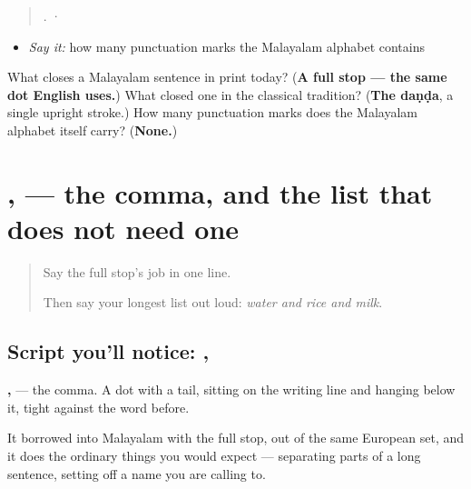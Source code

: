 \begin{quote}
.  ·  
\end{quote}

\begin{itemize}
\raggedright
  \item \emph{Say it:} how many punctuation marks the Malayalam alphabet contains
\end{itemize}

\begin{tcolorbox}[breakable,colback=teal!4,colframe=teal!35!black,title={Before you move on}]
What closes a Malayalam sentence in print today? (\textbf{A full stop — the same dot English uses.}) What closed one in the classical tradition? (\textbf{The daṇḍa}, a single upright stroke.) How many punctuation marks does the Malayalam alphabet itself carry? (\textbf{None.})
\end{tcolorbox}
\section[, (comma)]{, — the comma, and the list that does not need one}

\label{lesson:ML-W108-comma}



\begin{quote}
Say the full stop's job in one line.

Then say your longest list out loud: \emph{water and rice and milk}.
\end{quote}

\subsection*{Script you'll notice: ,}
\textbf{,} — the comma. A dot with a tail, sitting on the writing line and hanging below it, tight against the word before.

It borrowed into Malayalam with the full stop, out of the same European set, and it does the ordinary things you would expect — separating parts of a long sentence, setting off a name you are calling to.

